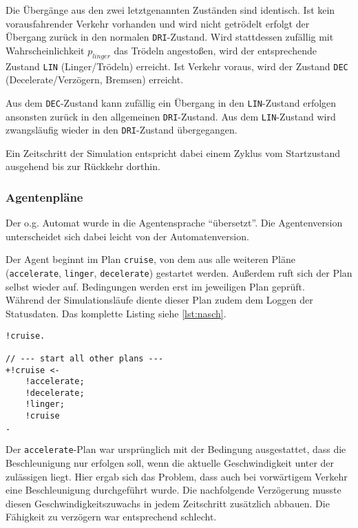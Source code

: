 Die Übergänge aus den zwei letztgenannten Zuständen sind identisch. 
Ist kein vorausfahrender Verkehr vorhanden und wird nicht getrödelt erfolgt der Übergang zurück in den normalen \texttt{DRI}-Zustand.
Wird stattdessen zufällig mit Wahrscheinlichkeit $ p_{linger} $ das Trödeln angestoßen, wird der entsprechende Zustand \texttt{LIN} (Linger/Trödeln) erreicht.
Ist Verkehr voraus, wird der Zustand \texttt{DEC} (Decelerate/Verzögern, Bremsen) erreicht.

Aus dem \texttt{DEC}-Zustand kann zufällig ein Übergang in den \texttt{LIN}-Zustand erfolgen ansonsten zurück in den allgemeinen \texttt{DRI}-Zustand.
Aus dem \texttt{LIN}-Zustand wird zwangsläufig wieder in den \texttt{DRI}-Zustand übergegangen.

Ein Zeitschritt der Simulation entspricht dabei einem Zyklus vom Startzustand ausgehend bis zur Rückkehr dorthin.


\subsubsection{Agentenpläne}

Der o.g. Automat wurde in die Agentensprache \enquote{übersetzt}. 
Die Agentenversion unterscheidet sich dabei leicht von der Automatenversion. 

Der Agent beginnt im Plan \texttt{cruise}, von dem aus alle weiteren Pläne (\texttt{accelerate}, \texttt{linger}, \texttt{decelerate}) gestartet werden.
Außerdem ruft sich der Plan selbst wieder auf.
Bedingungen werden erst im jeweiligen Plan geprüft.
\\
Während der Simulationsläufe diente dieser Plan zudem dem Loggen der Statusdaten.
Das komplette Listing siehe \cref{lst:nasch}.

\begin{minipage}[hptb]{0.95\textwidth}
\begin{lstlisting}[style=asl, 
                   keywords={!cruise}, 
                   keywords={[2]}, 
                   keywords={[3]}, 
                   caption={Auszug aus Agentenscript: single lane-Version},
                   label={lst:nasch-auszug}]      
!cruise.

// --- start all other plans ---
+!cruise <-
    !accelerate;
    !decelerate;
    !linger;
    !cruise
.\end{lstlisting}
\end{minipage}

Der \texttt{accelerate}-Plan war ursprünglich mit der Bedingung ausgestattet, dass die Beschleunigung nur erfolgen soll, wenn die aktuelle Geschwindigkeit unter der zulässigen liegt.
Hier ergab sich das Problem, dass auch bei vorwärtigem Verkehr eine Beschleunigung durchgeführt wurde. Die nachfolgende Verzögerung musste diesen Geschwindigkeitszuwachs in jedem Zeitschritt zusätzlich abbauen.
Die Fähigkeit zu verzögern war entsprechend schlecht.

